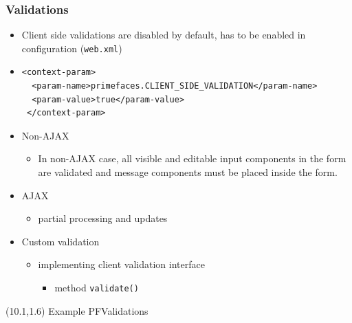 \documentclass[10pt,xcolor=pdflatex]{beamer}
\begin{document}
\begin{frame}[containsverbatim]\frametitle{Validations}
  \begin{itemize}
    \item Client side validations are disabled by default, has to be enabled in configuration (\texttt{web.xml})
	\item[] \begin{footnotesize} \begin{verbatim}
<context-param>
  <param-name>primefaces.CLIENT_SIDE_VALIDATION</param-name>
  <param-value>true</param-value>
 </context-param>		
		\end{verbatim} \end{footnotesize}
    \item Non-AJAX
      \begin{itemize}
    	\item In non-AJAX case, all visible and editable input components in the form are validated and message components must be placed inside the form.
      \end{itemize}
    \item AJAX
   	  \begin{itemize}
   		\item partial processing and updates
   	  \end{itemize}
    \item Custom validation
      \begin{itemize}
   	 	\item implementing client validation interface
          \begin{itemize}
            \item method \texttt{validate()}
          \end{itemize}
      \end{itemize}
  \end{itemize}
\begin{textblock}{10}(10.1,1.6)
    {\footnotesize Example PFValidations}
\end{textblock}
\end{frame}
\end{document}
